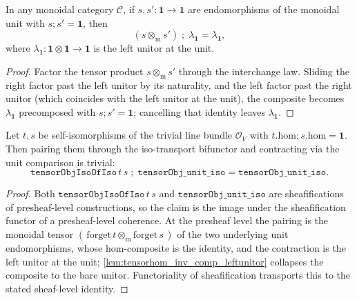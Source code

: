 \begin{lemma}\leanok
  \label{lem:tensorhom_inv_comp_leftunitor}
  In any monoidal category \(\mathcal C\), if \(s, s' : \mathbf 1 \to \mathbf 1\) are endomorphisms
  of the monoidal unit with \(s \mathbin{;} s' = \mathbf 1\), then
  \[
    (s \otimes_{\mathrm m} s') \;\mathbin{;}\; \lambda_{\mathbf 1} = \lambda_{\mathbf 1},
  \]
  where \(\lambda_{\mathbf 1} : \mathbf 1 \otimes \mathbf 1 \to \mathbf 1\) is the left unitor at the
  unit.
\end{lemma}
\begin{proof}

\leanok
  Factor the tensor product \(s \otimes_{\mathrm m} s'\) through the interchange law. Sliding the
  right factor past the left unitor by its naturality, and the left factor past the right unitor
  (which coincides with the left unitor at the unit), the composite becomes \(\lambda_{\mathbf 1}\)
  precomposed with \(s \mathbin{;} s' = \mathbf 1\); cancelling that identity leaves
  \(\lambda_{\mathbf 1}\).
\end{proof}

\begin{lemma}\leanok
  \label{lem:tensorobjisoofiso_comp_unit_iso}
  Let \(t, s\) be self-isomorphisms of the trivial line bundle \(\mathcal O_V\) with
  \(t.\mathrm{hom} \mathbin{;} s.\mathrm{hom} = \mathbf 1\). Then pairing them through the
  iso-transport bifunctor and contracting via the unit comparison is trivial:
  \[
    \mathtt{tensorObjIsoOfIso}\,t\,s \;\mathbin{;}\; \mathtt{tensorObj\_unit\_iso}
      = \mathtt{tensorObj\_unit\_iso}.
  \]
\end{lemma}
\begin{proof}
  \leanok
  Both \(\mathtt{tensorObjIsoOfIso}\,t\,s\) and \(\mathtt{tensorObj\_unit\_iso}\) are sheafifications
  of presheaf-level constructions, so the claim is the image under the sheafification functor of a
  presheaf-level coherence. At the presheaf level the pairing is the monoidal tensor
  \((\,\mathrm{forget}\,t \otimes_{\mathrm m} \mathrm{forget}\,s\,)\) of the two underlying unit
  endomorphisms, whose hom-composite is the identity, and the contraction is the left unitor at the
  unit; \cref{lem:tensorhom_inv_comp_leftunitor} collapses the composite to the bare unitor.
  Functoriality of sheafification transports this to the stated sheaf-level identity.
\end{proof}

